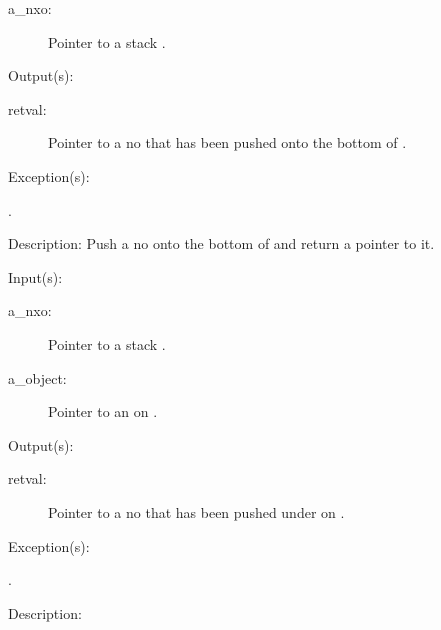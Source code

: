 \begin{capi}
\begin{capilist}
		\begin{description}\item[]
		\item[a\_nxo: ]
			Pointer to a stack .
		\end{description}
	\item[Output(s): ]
		\begin{description}\item[]
		\item[retval: ]
			Pointer to a no  that has been pushed
			onto the bottom of .
		\end{description}
	\item[Exception(s): ]
		\begin{description}\item[]
		\item[.]
		\end{description}
	\item[Description: ]
		Push a no  onto the bottom of  and
		return a pointer to it.
	\end{capilist}
\label{nxo_stack_under_push}
	\begin{capilist}
	\item[Input(s): ]
		\begin{description}\item[]
		\item[a\_nxo: ]
			Pointer to a stack .
		\item[a\_object: ]
			Pointer to an  on .
		\end{description}
	\item[Output(s): ]
		\begin{description}\item[]
		\item[retval: ]
			Pointer to a no  that has been pushed
			under  on .
		\end{description}
	\item[Exception(s): ]
		\begin{description}\item[]
		\item[.]
		\end{description}
	\item[Description: ]

\end{capilist}
\end{capi}
